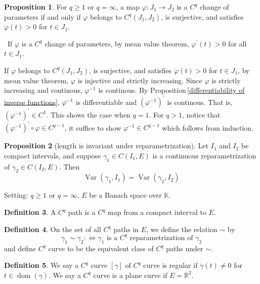 \documentclass[12pt,a4paper]{book}
\newenvironment{prooff}{{\noindent\it\textcolor{cyan!40!black}{Proof}:}\,}{\par}
\newcommand{\bb}[1]{\mathbb{#1}}
\newcommand{\p}{^{\prime}}
\theoremstyle{definition}
\newtheorem{defn}{Definition}[section]
\newtheorem{prop}[defn]{Proposition}
\begin{document}
\begin{prop}
    For $q\ge 1$ or $q=\infty$, a map 
    $\varphi: J_1 \rightarrow J_2$ is a 
    $C^q$ change of parameters if and only if 
    $\varphi$ belongs to $C^q\left(J_1, J_2\right)$, is surjective, and satisfies $\dot{\varphi}(t)>0$ for $t \in J_1$.
\end{prop}
\begin{prooff}
    If $\varphi$ is a 
    $C^q$ change of parameters, 
    by mean value theorem, 
    $\varphi\p(t)> 0$ for all $t\in J_1$. 

    If $\varphi$ belongs to $C^q\left(J_1, J_2\right)$, is surjective, 
    and satisfies $\dot{\varphi}(t)>0$ for $t \in J_1$, 
    by mean value theorem, $\varphi$ is injective and strictly increasing. 
    Since $\varphi$ is strictly increasing and continous, $\varphi^{-1}$ is continous. 
    By Proposition\,\ref{differentiability of inverse functions}, $\varphi^{-1}$
    is differentiable and $(\varphi^{-1})\p$ is continous. That is, 
    $(\varphi^{-1})\p\in C^1$. This shows the case when $q=1$. For $q>1$, 
    notice that $(\varphi^{-1})\p\circ \varphi \in C^{q-1}$, 
    it suffice to show $\varphi^{-1}\in C^{q-1}$ which follows from induction.


\end{prooff}
\begin{prop}[length is invariant under reparametrization]
    Let $I_1$ and $I_2$ be compact intervals, and suppose $\gamma_1 \in C\left(I_1, E\right)$ is a continuous reparametrization of $\gamma_2 \in C\left(I_2, E\right)$. Then
    $$
    \operatorname{Var}\left(\gamma_1, I_1\right)=\operatorname{Var}\left(\gamma_2, I_2\right)
    $$
\end{prop}
Setting: $q\ge 1$ or $q=\infty$, $E$ be a Banach space over $\bb{K}$.
\begin{defn}
    A $C^q$ path is a $C^q$ map from a compact interval to $E$. 
\end{defn}
\begin{defn}
    On the set of all $C^q$ paths in $E$, 
    we define the relation $\sim$ by
    $$
    \gamma_1 \sim \gamma_2: \Leftrightarrow \gamma_1 \text { is a } C^q \text { reparametrization of } \gamma_2
    $$
    and define $C^q$ curve to be the equivalent class of $C^q$ paths under $\sim$. 

\end{defn}
\begin{defn}
    We say a $C^q$ curve $[\gamma]$ 
    of $C^q$ curve is regular if $\dot{\gamma}(t) \neq 0$ for $t \in \operatorname{dom}(\gamma)$.
    We say a $C^q$ curve is a plane curve if $E=\bb{R}^2$.
\end{defn}
\end{document}
